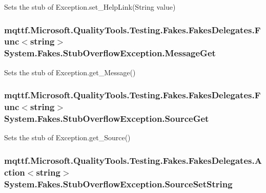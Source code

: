 Sets the stub of Exception.\-set\-\_\-\-Help\-Link(\-String value)

\hypertarget{class_system_1_1_fakes_1_1_stub_overflow_exception_a606076b90381cfdcdcb9ad14eb0ebade}{
\subsubsection[{Message\-Get}]{\setlength{\rightskip}{0pt plus 5cm}mqttf.\-Microsoft.\-Quality\-Tools.\-Testing.\-Fakes.\-Fakes\-Delegates.\-Func$<$string$>$ System.\-Fakes.\-Stub\-Overflow\-Exception.\-Message\-Get}}\label{class_system_1_1_fakes_1_1_stub_overflow_exception_a606076b90381cfdcdcb9ad14eb0ebade}


Sets the stub of Exception.\-get\-\_\-\-Message()

\hypertarget{class_system_1_1_fakes_1_1_stub_overflow_exception_a4891e50b6a010c4bbf9e1ff22e86adb3}{
\subsubsection[{Source\-Get}]{\setlength{\rightskip}{0pt plus 5cm}mqttf.\-Microsoft.\-Quality\-Tools.\-Testing.\-Fakes.\-Fakes\-Delegates.\-Func$<$string$>$ System.\-Fakes.\-Stub\-Overflow\-Exception.\-Source\-Get}}\label{class_system_1_1_fakes_1_1_stub_overflow_exception_a4891e50b6a010c4bbf9e1ff22e86adb3}


Sets the stub of Exception.\-get\-\_\-\-Source()

\hypertarget{class_system_1_1_fakes_1_1_stub_overflow_exception_a5679f15757e7122cdbc283783b322c92}{
\subsubsection[{Source\-Set\-String}]{\setlength{\rightskip}{0pt plus 5cm}mqttf.\-Microsoft.\-Quality\-Tools.\-Testing.\-Fakes.\-Fakes\-Delegates.\-Action$<$string$>$ System.\-Fakes.\-Stub\-Overflow\-Exception.\-Source\-Set\-String}}\label{class_system_1_1_fakes_1_1_stub_overflow_exception_a5679f15757e7122cdbc283783b322c92}


